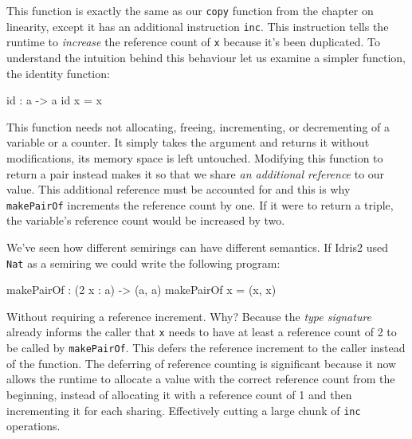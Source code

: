 \documentclass[
]{article}
\newenvironment{Shaded}{}{}
\newcommand{\DecValTok}[1]{\textcolor[rgb]{0.25,0.63,0.44}{#1}}
\newcommand{\FunctionTok}[1]{\textcolor[rgb]{0.02,0.16,0.49}{#1}}
\newcommand{\NormalTok}[1]{#1}
\newcommand{\OperatorTok}[1]{\textcolor[rgb]{0.40,0.40,0.40}{#1}}
\newcommand{\OtherTok}[1]{\textcolor[rgb]{0.00,0.44,0.13}{#1}}
\begin{document}
This function is exactly the same as our \texttt{copy} function from the
chapter on linearity, except it has an additional instruction
\texttt{inc}. This instruction tells the runtime to \emph{increase} the
reference count of \texttt{x} because it's been duplicated. To
understand the intuition behind this behaviour let us examine a simpler
function, the identity function:

\begin{Shaded}
\begin{Highlighting}[]
\FunctionTok{id} \OperatorTok{:}\NormalTok{ a }\OtherTok{{-}\textgreater{}}\NormalTok{ a}
\FunctionTok{id}\NormalTok{ x }\OtherTok{=}\NormalTok{ x}
\end{Highlighting}
\end{Shaded}

This function needs not allocating, freeing, incrementing, or
decrementing of a variable or a counter. It simply takes the argument
and returns it without modifications, its memory space is left
untouched. Modifying this function to return a pair instead makes it so
that we share \emph{an additional reference} to our value. This
additional reference must be accounted for and this is why
\texttt{makePairOf} increments the reference count by one. If it were to
return a triple, the variable's reference count would be increased by
two.

We've seen how different semirings can have different semantics. If
Idris2 used \texttt{Nat} as a semiring we could write the following
program:

\begin{Shaded}
\begin{Highlighting}[]
\NormalTok{makePairOf }\OperatorTok{:}\NormalTok{ (}\DecValTok{2}\NormalTok{ x }\OperatorTok{:}\NormalTok{ a) }\OtherTok{{-}\textgreater{}}\NormalTok{ (a, a)}
\NormalTok{makePairOf x }\OtherTok{=}\NormalTok{ (x, x)}
\end{Highlighting}
\end{Shaded}

Without requiring a reference increment. Why? Because the \emph{type
signature} already informs the caller that \texttt{x} needs to have at
least a reference count of 2 to be called by \texttt{makePairOf}. This
defers the reference increment to the caller instead of the function.
The deferring of reference counting is significant because it now allows
the runtime to allocate a value with the correct reference count from
the beginning, instead of allocating it with a reference count of 1 and
then incrementing it for each sharing. Effectively cutting a large chunk
of \texttt{inc} operations.
\end{document}
